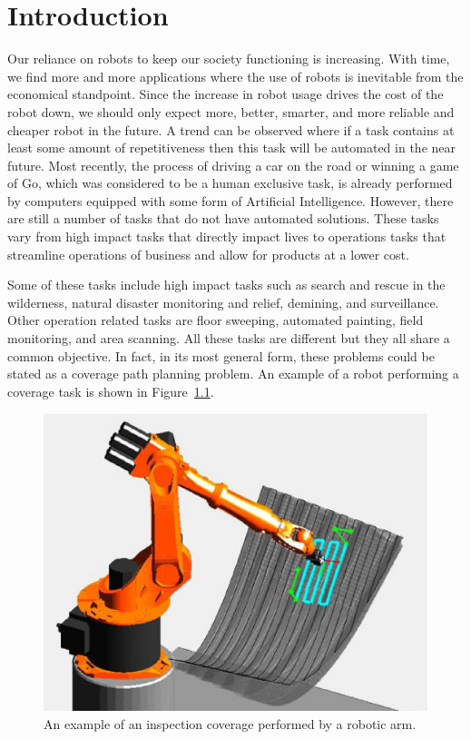 \documentclass[../main.tex]{subfiles}
\begin{document}
\chapter{Introduction}
\label{chapter:introduction}

Our reliance on robots to keep our society functioning is increasing. With time, we find more and more applications where the use of robots is inevitable from the economical standpoint. Since the increase in robot usage drives the cost of the robot down, we should only expect more, better, smarter, and more reliable and cheaper robot in the future. A trend can be observed where if a task contains at least some amount of repetitiveness then this task will be automated in the near future. Most recently, the process of driving a car on the road or winning a game of Go, which was considered to be a human exclusive task, is already performed by computers equipped with some form of Artificial Intelligence. However, there are still a number of tasks that do not have automated solutions. These tasks vary from high impact tasks that directly impact lives to operations tasks that streamline operations of business and allow for products at a lower cost.

Some of these tasks include high impact tasks such as search and rescue in the wilderness, natural disaster monitoring and relief, demining, and surveillance. Other operation related tasks are floor sweeping, automated painting, field monitoring, and area scanning. All these tasks are different but they all share a common objective. In fact, in its most general form, these problems could be stated as a coverage path planning problem. An example of a robot performing a coverage task is shown in Figure~\ref{img:example_coverage}.

\begin{figure}[!hbt]
	\centering
	\includegraphics[scale=0.5]{img/chapter_1/example_coverage.eps}
	\caption{An example of an inspection coverage performed by a robotic arm.}
	\label{img:example_coverage}
\end{figure}
\end{document}
